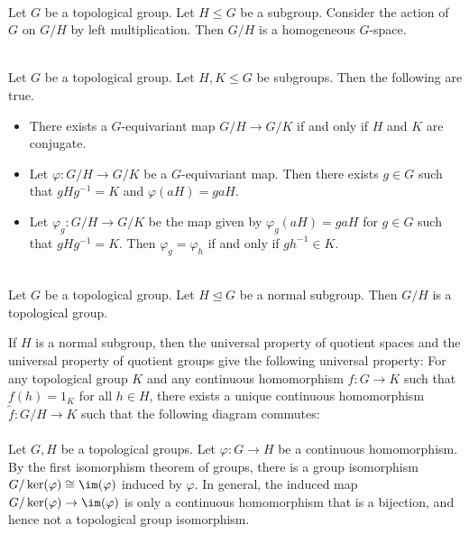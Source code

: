 \documentclass[a4paper]{article}
\begin{document}
\begin{prp}{}{}\\
Let $G$ be a topological group. Let $H\leq G$ be a subgroup. Consider the action of $G$ on $G/H$ by left multiplication. Then $G/H$ is a homogeneous $G$-space. 
\end{prp}

\begin{prp}{}{}\\
Let $G$ be a topological group. Let $H,K\leq G$ be subgroups. Then the following are true. 
\begin{itemize}
\item There exists a $G$-equivariant map $G/H\to G/K$ if and only if $H$ and $K$ are conjugate. 
\item Let $\varphi:G/H\to G/K$ be a $G$-equivariant map. Then there exists $g\in G$ such that $gHg^{-1}=K$ and $\varphi(aH)=gaH$. 
\item Let $\varphi_g:G/H\to G/K$ be the map given by $\varphi_g(aH)=gaH$ for $g\in G$ such that $gHg^{-1}=K$. Then $\varphi_g=\varphi_h$ if and only if $gh^{-1}\in K$. 
\end{itemize}
\end{prp}

\begin{prp}{}{}\\
Let $G$ be a topological group. Let $H\trianglelefteq G$ be a normal subgroup. Then $G/H$ is a topological group. 
\end{prp}

If $H$ is a normal subgroup, then the universal property of quotient spaces and the universal property of quotient groups give the following universal property: For any topological group $K$ and any continuous homomorphism $f:G\to K$ such that $f(h)=1_K$ for all $h\in H$, there exists a unique continuous homomorphism $\widetilde{f}:G/H\to K$ such that the following diagram commutes: \\
\\

Let $G,H$ be a topological groups. Let $\varphi:G\to H$ be a continuous homomorphism. By the first isomorphism theorem of groups, there is a group isomorphism $G/\ker(\varphi)\cong\im(\varphi)$ induced by $\varphi$. In general, the induced map $G/\ker(\varphi)\to\im(\varphi)$ is only a continuous homomorphism that is a bijection, and hence not a topological group isomorphism. 
\end{document}
